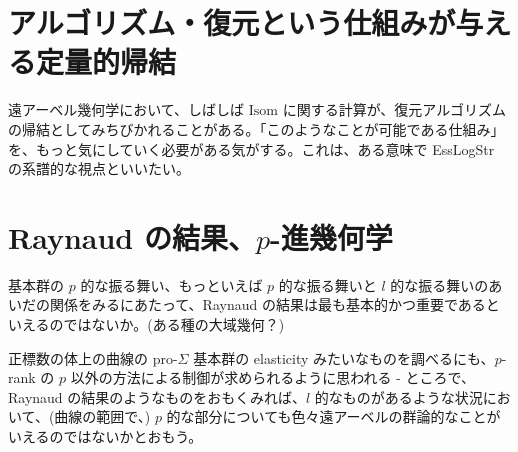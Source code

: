 \documentclass[dvipdfmx]{article}
\theoremstyle{definition}
\begin{document}
\section{アルゴリズム・復元という仕組みが与える定量的帰結}

遠アーベル幾何学において、しばしば $\mathrm{Isom}$ に関する計算が、復元アルゴリズムの帰結としてみちびかれることがある。「このようなことが可能である仕組み」を、もっと気にしていく必要がある気がする。これは、ある意味で EssLogStr の系譜的な視点といいたい。

\section{Raynaud の結果、$p$-進幾何学}

基本群の $p$ 的な振る舞い、もっといえば $p$ 的な振る舞いと $l$ 的な振る舞いのあいだの関係をみるにあたって、Raynaud の結果は最も基本的かつ重要であるといえるのではないか。(ある種の大域幾何？)

正標数の体上の曲線の pro-$\Sigma$ 基本群の elasticity みたいなものを調べるにも、$p$-rank の $p$ 以外の方法による制御が求められるように思われる - ところで、Raynaud の結果のようなものをおもくみれば、$l$ 的なものがあるような状況において、(曲線の範囲で、) $p$ 的な部分についても色々遠アーベルの群論的なことがいえるのではないかとおもう。
\end{document}

